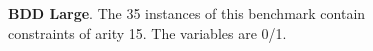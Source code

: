 \newpage

\begin{figure}
  \begin{minipage}[b][10cm][s]{0.45\textwidth}
    \centering
    \vfill
    \begin{tikzpicture}[scale=0.8]
      
    \end{tikzpicture}
    \vfill
    \caption{\textbf{BDD Large}.
      The 35 instances of this benchmark contain constraints
      of arity 15. The variables are 0/1.}
    \vspace{\baselineskip}
  \end{minipage}\qquad
\end{figure}
